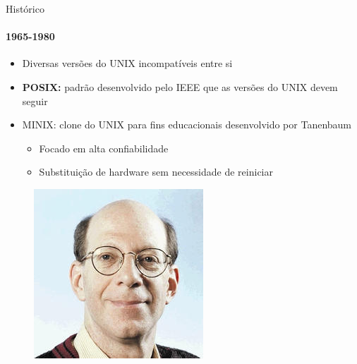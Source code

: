 \documentclass{beamer}
\begin{document}
\begin{frame}{Histórico}
	\framesubtitle{1965-1980}
	\begin{itemize}
		\item Diversas versões do UNIX incompatíveis entre si
		\item \textbf{POSIX:} padrão desenvolvido pelo IEEE que as versões do UNIX devem seguir
		\item{MINIX:} clone do UNIX para fins educacionais desenvolvido por Tanenbaum
		\begin{itemize}
			\item Focado em alta confiabilidade
			\item Substituição de hardware sem necessidade de reiniciar
		\end{itemize}
	\end{itemize}
	\begin{figure}
		\includegraphics[width=0.2\paperwidth]{resources/tanenbaum}
	\end{figure}
\end{frame}
\end{document}
